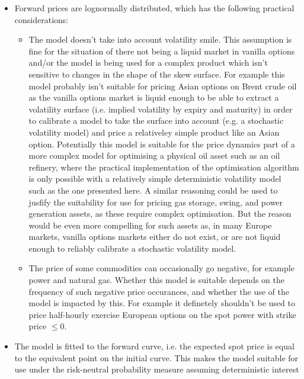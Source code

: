 \documentclass{article}
\begin{document}
\begin{itemize}
    \item Forward prices are lognormally distributed, which has the following practical
    considerations: 
    \begin{itemize}
        \item The model doesn't take into account volatility smile. This assumption is
        fine for the situation of there not being a liquid market in vanilla 
        options and/or the model is being used for a complex product which isn't sensitive
        to changes in the shape of the skew surface. For example this model probably isn't
        suitable for pricing Asian options on Brent crude oil as the vanilla options market
        is liquid enough to be able to extract a volatility surface (i.e. implied volatility
        by expiry and maturity) in order to calibrate a model to take the surface into account
        (e.g. a stochastic volatility model) and price a relativeley simple product like an 
        Asian option. Potentially this model is suitable for the price dynamics part of a 
        more complex model for 
        optimising a physical oil asset such as an oil refinery, where the 
        practical implementation of the optimisation algorithm is only possible with a relatively
        simple deterministic volatility model such as the one presented here. A similar reasoning
        could be used to jusfify the suitability for use for pricing gas storage, swing, and
        power generation assets, as these require complex optimisation. But the reason would
        be even more compelling for such assets as, in many Europe markets, vanilla options
        markets either do not exist, or are not liquid enough to reliably calibrate a
        stochastic volatility model.
        \item The price of some commodities can occasionally go negative, for example
        power and natural gas. Whether this model is suitable depends on the frequency
        of such negative price occurances, and whether the use of the model is impacted
        by this. For example it definetely shouldn't be used to price half-hourly exercise
        European options on the spot power with strike price $\leq 0$.
    \end{itemize}
    \item The model is fitted to the forward curve, i.e. the expected spot price 
    is equal to the equivalent point on the initial curve. This makes the model suitable
    for use under the risk-neutral probability measure assuming deterministic interest

\end{itemize}
\end{document}
